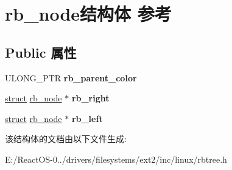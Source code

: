\hypertarget{structrb__node}{}\section{rb\+\_\+node结构体 参考}
\label{structrb__node}
\subsection*{Public 属性}
\begin{DoxyCompactItemize}
\item 
\mbox{\label{structrb__node_a7045ad939d26fb59f67695ea4a15d3ef}} 
U\+L\+O\+N\+G\+\_\+\+P\+TR {\bfseries rb\+\_\+parent\+\_\+color}
\item 
\mbox{\label{structrb__node_addfd0d9e38c1c4230cfb76e04416871b}} 
\hyperlink{interfacestruct}{struct} \hyperlink{structrb__node}{rb\+\_\+node} $\ast$ {\bfseries rb\+\_\+right}
\item 
\mbox{\label{structrb__node_a3d07d7f950f64c9e049229d4a874c652}} 
\hyperlink{interfacestruct}{struct} \hyperlink{structrb__node}{rb\+\_\+node} $\ast$ {\bfseries rb\+\_\+left}
\end{DoxyCompactItemize}


该结构体的文档由以下文件生成\+:\begin{DoxyCompactItemize}
\item 
E\+:/\+React\+O\+S-\/0../drivers/filesystems/ext2/inc/linux/rbtree.\+h\end{DoxyCompactItemize}
